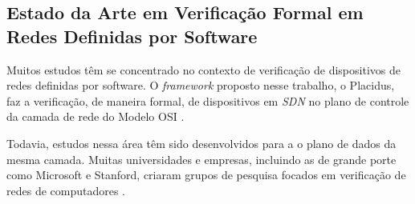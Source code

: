 \documentclass[12pt]{article}
\begin{document}
\begin{table}[]
\caption{Plano de Dados vs Plano de Controle. Fonte: obtido pelo autor, 2019.}
\label{table:pdpc}
\end{table}

\subsection{Estado da Arte em Verificação Formal em Redes Definidas por Software} 

Muitos estudos têm se concentrado no contexto de verificação de dispositivos de redes definidas por software.
O \textit{framework} proposto nesse trabalho, o Placidus, faz a verificação, de maneira formal, de dispositivos em \textit{SDN} no plano de controle da camada de rede do Modelo OSI \cite{1094702}.

Todavia, estudos nessa área têm sido desenvolvidos para a o plano de dados da mesma camada.
Muitas universidades e empresas, incluindo as de grande porte como Microsoft e Stanford, criaram grupos de pesquisa focados em verificação de redes de computadores \cite{123456}.
\end{document}
